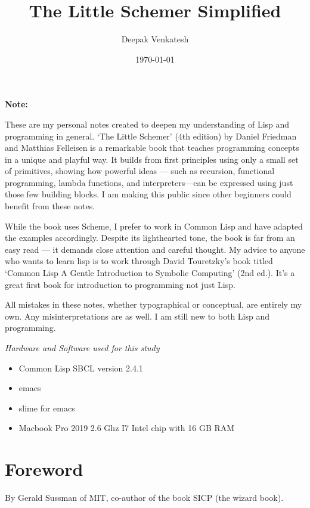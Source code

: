 \documentclass[11pt]{article}
\author{Deepak Venkatesh}
\date{\today}
\title{The Little Schemer Simplified}
\begin{document}
\maketitle
\tableofcontents

\newpage
\textbf{Note:}

\vspace{1em}

These are my personal notes created to deepen my understanding of Lisp and programming in general. `The Little Schemer'
(4th edition) by Daniel Friedman and Matthias Felleisen is a remarkable book that teaches programming concepts in a
unique and playful way. It builds from first principles using only a small set of primitives, showing how powerful
ideas — such as recursion, functional programming, lambda functions, and interpreters—can be expressed using just
those few building blocks. I am making this public since other beginners could benefit from these notes.

While the book uses Scheme, I prefer to work in Common Lisp and have adapted the examples accordingly. Despite its
lighthearted tone, the book is far from an easy read — it demands close attention and careful thought. My advice to
anyone who wants to learn lisp is to work through David Touretzky's book titled `Common Lisp A Gentle Introduction to
Symbolic Computing' (2nd ed.). It's a great first book for introduction to programming not just Lisp.

All mistakes in these notes, whether typographical or conceptual, are entirely my own. Any misinterpretations are as
well. I am still new to both Lisp and programming.

\vspace{1em}

\emph{Hardware and Software used for this study}
\begin{itemize}
\item Common Lisp SBCL version 2.4.1
\item emacs
\item slime for emacs
\item Macbook Pro 2019 2.6 Ghz I7 Intel chip with 16 GB RAM
\end{itemize}

\newpage
\section{Foreword}
\label{sec:org79e8220}

By Gerald Sussman of MIT, co-author of the book SICP (the wizard book).
\end{document}
